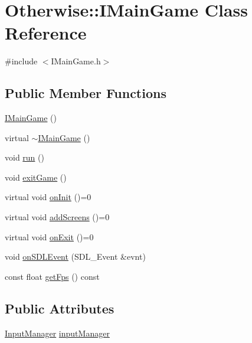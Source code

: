\hypertarget{class_otherwise_1_1_i_main_game}{}\section{Otherwise\+:\+:I\+Main\+Game Class Reference}
\label{class_otherwise_1_1_i_main_game}


{\ttfamily \#include $<$I\+Main\+Game.\+h$>$}

\subsection*{Public Member Functions}
\begin{DoxyCompactItemize}
\item 
\hyperlink{class_otherwise_1_1_i_main_game_a7c7022f55c7c337012e2a2807bdcc7be}{I\+Main\+Game} ()
\item 
virtual \hyperlink{class_otherwise_1_1_i_main_game_a0a914b8a3ed77c6276b0b117f212b21e}{$\sim$\+I\+Main\+Game} ()
\item 
void \hyperlink{class_otherwise_1_1_i_main_game_ad78a85255ee33964be3409c3dfa70963}{run} ()
\item 
void \hyperlink{class_otherwise_1_1_i_main_game_ae26fe0166901cfdd02150bda42870093}{exit\+Game} ()
\item 
virtual void \hyperlink{class_otherwise_1_1_i_main_game_a1c56e48c28bc0e984328083ccdd99908}{on\+Init} ()=0
\item 
virtual void \hyperlink{class_otherwise_1_1_i_main_game_ad74c1f643eab910737647db8d5110d47}{add\+Screens} ()=0
\item 
virtual void \hyperlink{class_otherwise_1_1_i_main_game_a81f4e97badc55d6eb6de119eea6247df}{on\+Exit} ()=0
\item 
void \hyperlink{class_otherwise_1_1_i_main_game_a6baa44857c11c6c1d1e0085f5dbf953d}{on\+S\+D\+L\+Event} (S\+D\+L\+\_\+\+Event \&evnt)
\item 
const float \hyperlink{class_otherwise_1_1_i_main_game_ad029d855d08e30c027050f3ac40cc35a}{get\+Fps} () const
\end{DoxyCompactItemize}
\subsection*{Public Attributes}
\begin{DoxyCompactItemize}
\item 
\hyperlink{class_otherwise_1_1_input_manager}{Input\+Manager} \hyperlink{class_otherwise_1_1_i_main_game_a00d93419b43f09f7708a0c872e3b09c8}{input\+Manager}
\end{DoxyCompactItemize}
